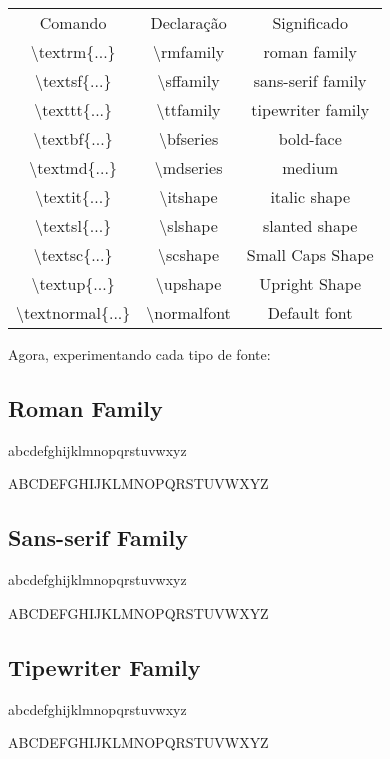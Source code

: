 \documentclass[a4paper, 12pt, oneside]{book}
\begin{document}
\begin{center}
\begin{tabular}{ c c c }
Comando & Declaração & Significado \\
\textbackslash textrm\{...\}&\textbackslash rmfamily&roman family\\
\textbackslash textsf\{...\}&\textbackslash sffamily&sans-serif family\\
\textbackslash texttt\{...\}&\textbackslash ttfamily&tipewriter family\\
\textbackslash textbf\{...\}&\textbackslash bfseries&bold-face\\
\textbackslash textmd\{...\}&\textbackslash mdseries&medium\\
\textbackslash textit\{...\}&\textbackslash itshape&italic shape\\
\textbackslash textsl\{...\}&\textbackslash slshape&slanted shape\\
\textbackslash textsc\{...\}&\textbackslash scshape&Small Caps Shape\\
\textbackslash textup\{...\}&\textbackslash upshape&Upright Shape\\
\textbackslash textnormal\{...\} & \textbackslash normalfont & Default font\\
\end{tabular}
\end{center}

\vspace{10pt}

Agora, experimentando cada tipo de fonte:

\subsection{Roman Family}
\textrm{abcdefghijklmnopqrstuvwxyz}

\textrm{ABCDEFGHIJKLMNOPQRSTUVWXYZ}

\subsection{Sans-serif Family}
\textsf{abcdefghijklmnopqrstuvwxyz}

\textsf{ABCDEFGHIJKLMNOPQRSTUVWXYZ}

\subsection{Tipewriter Family}
\textrm{abcdefghijklmnopqrstuvwxyz}

\textrm{ABCDEFGHIJKLMNOPQRSTUVWXYZ}
\end{document}
